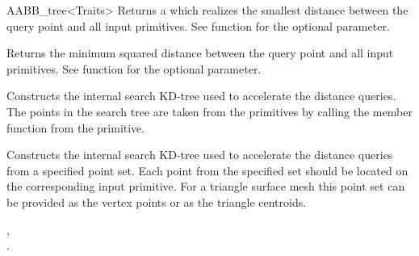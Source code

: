 \begin{ccRefClass}{AABB_tree<Traits>}
{Returns a  which realizes the smallest distance between the query point and all input primitives. See  function for the optional  parameter. }

{Returns the minimum squared distance between the query point and all input primitives. See  function for the optional  parameter. }



{ Constructs the internal search KD-tree used to accelerate the distance queries. The points in the search tree are taken from the primitives by calling the member function  from the primitive.}

\begin{ccAdvanced}
{ Constructs the internal search KD-tree used to accelerate the distance queries from a specified point set. Each point from the specified  set should be located on the corresponding input primitive. For a triangle surface mesh this point set can be provided as the vertex points or as the triangle centroids.}
\end{ccAdvanced}

\ccSeeAlso

, \\
.

\end{ccRefClass}

\ccRefPageEnd

